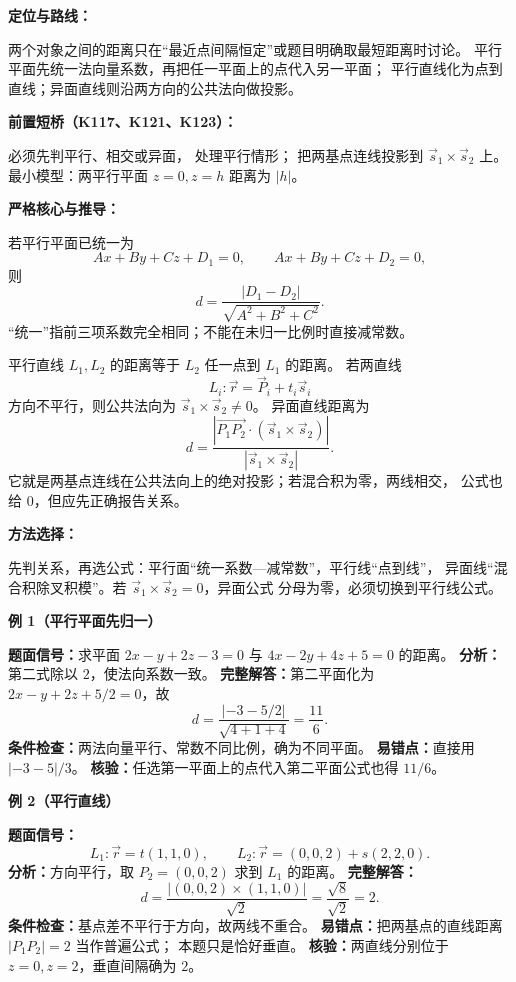 \begin{knowledgeBox}
\textbf{定位与路线：}

两个对象之间的距离只在“最近点间隔恒定”或题目明确取最短距离时讨论。
平行平面先统一法向量系数，再把任一平面上的点代入另一平面；
平行直线化为点到直线；异面直线则沿两方向的公共法向做投影。

\textbf{前置短桥（K117、K121、K123）：}

必须先判平行、相交或异面，
处理平行情形；
把两基点连线投影到
\(\vec s_1\times\vec s_2\) 上。最小模型：两平行平面 \(z=0,z=h\)
距离为 \(|h|\)。

\textbf{严格核心与推导：}

若平行平面已统一为
\[
Ax+By+Cz+D_1=0,\qquad Ax+By+Cz+D_2=0,
\]
则
\[
d=\frac{|D_1-D_2|}{\sqrt{A^2+B^2+C^2}}.
\]
“统一”指前三项系数完全相同；不能在未归一比例时直接减常数。

平行直线 \(L_1,L_2\) 的距离等于 \(L_2\) 任一点到 \(L_1\) 的距离。
若两直线
\[
L_i:\vec r=\vec P_i+t_i\vec s_i
\]
方向不平行，则公共法向为 \(\vec s_1\times\vec s_2\ne0\)。
异面直线距离为
\[
d=\frac{|\overrightarrow{P_1P_2}\cdot
(\vec s_1\times\vec s_2)|}{|\vec s_1\times\vec s_2|}.
\]
它就是两基点连线在公共法向上的绝对投影；若混合积为零，两线相交，
公式也给 \(0\)，但应先正确报告关系。

\textbf{方法选择：}

先判关系，再选公式：平行面“统一系数—减常数”，平行线“点到线”，
异面线“混合积除叉积模”。若 \(\vec s_1\times\vec s_2=0\)，异面公式
分母为零，必须切换到平行线公式。

\textbf{例 1（平行平面先归一）}

\textbf{题面信号：}求平面 \(2x-y+2z-3=0\) 与
\(4x-2y+4z+5=0\) 的距离。
\textbf{分析：}第二式除以 \(2\)，使法向系数一致。
\textbf{完整解答：}第二平面化为
\(2x-y+2z+5/2=0\)，故
\[
d=\frac{|-3-5/2|}{\sqrt{4+1+4}}=\frac{11}{6}.
\]
\textbf{条件检查：}两法向量平行、常数不同比例，确为不同平面。
\textbf{易错点：}直接用 \(|-3-5|/3\)。
\textbf{核验：}任选第一平面上的点代入第二平面公式也得 \(11/6\)。

\textbf{例 2（平行直线）}

\textbf{题面信号：}
\[
L_1:\vec r=t(1,1,0),\qquad
L_2:\vec r=(0,0,2)+s(2,2,0).
\]
\textbf{分析：}方向平行，取 \(P_2=(0,0,2)\) 求到 \(L_1\) 的距离。
\textbf{完整解答：}
\[
d=\frac{|(0,0,2)\times(1,1,0)|}{\sqrt2}
=\frac{\sqrt8}{\sqrt2}=2.
\]
\textbf{条件检查：}基点差不平行于方向，故两线不重合。
\textbf{易错点：}把两基点的直线距离 \(|P_1P_2|=2\) 当作普遍公式；
本题只是恰好垂直。
\textbf{核验：}两直线分别位于 \(z=0,z=2\)，垂直间隔确为 \(2\)。


\end{knowledgeBox}
